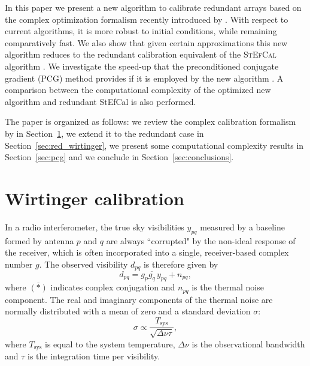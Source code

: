 \documentclass[useAMS,usenatbib]{mn2e}
\newcommand{\conj}[1]{\overline{#1}}
\begin{document}
In this paper we present a new algorithm to calibrate redundant arrays based on the complex optimization formalism recently introduced by \cite{Smirnov2015}. 
With respect to current algorithms, it is more robust to initial conditions, while remaining comparatively fast. We also show that given certain approximations this new algorithm reduces to the redundant calibration equivalent of the \textsc{StEfCal} algorithm \citep{Salvini2014}.
We investigate the speed-up that the preconditioned conjugate gradient (PCG) method provides if it is employed by the new algorithm \citep{Liu2010}.
A comparison between the computational complexity of the optimized new algorithm and redundant StEfCal is also performed.

The paper is organized as follows: we review the complex calibration formalism by \citet{Smirnov2015} in Section~\ref{sec:sky_wirtinger}, we extend it to the redundant case in Section~\ref{sec:red_wirtinger}, we present some computational complexity results in Section~\ref{sec:pcg} and we conclude in Section~\ref{sec:conclusions}.

\section{Wirtinger calibration}
\label{sec:sky_wirtinger}

In a radio interferometer, the true sky visibilities $y_{pq}$ measured by a baseline formed by antenna $p$ and $q$ are always ``corrupted" by the non-ideal response of the receiver, which is often incorporated into a single, receiver-based complex number $g$. The observed visibility $d_{pq}$ is therefore given by \citep{ME1,ME2,RRIME1}
\begin{equation}
\label{eq:vis_definition}
d_{pq} = g_{p}\conj{g_q} \, y_{pq} + n_{pq},
\end{equation}
where $\conj{(*)}$ indicates conplex conjugation and $n_{pq}$ is the thermal noise component. 
The real and imaginary components of the thermal noise are normally distributed with a mean of zero and a
standard deviation $\sigma$:
\begin{equation}
\sigma \propto \frac{T_{\textrm{sys}}}{\sqrt{\Delta \nu \tau}},
\end{equation}
where $T_{\textrm{sys}}$ is equal to the system temperature, $\Delta \nu$ is the observational bandwidth and $\tau$ is the integration time per visibility.
\end{document}
